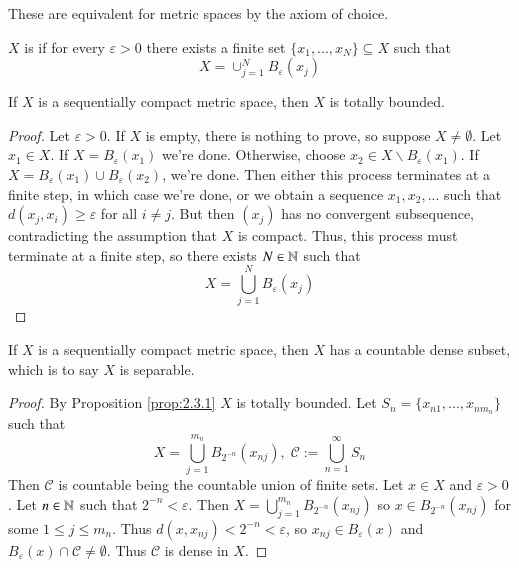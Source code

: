 These are equivalent for metric spaces by the axiom of choice.

\begin{defn}
    $X$ is  if for every $\varepsilon > 0$ there exists a finite set $\{x_1,...,x_N\} \subseteq X$ such that \begin{equation*}
        X = \cup_{j=1}^NB_{\varepsilon}(x_j)
    \end{equation*}
\end{defn}

\begin{prop}\label{prop:2.3.1}
    If $X$ is a sequentially compact metric space, then $X$ is totally bounded.
\end{prop}
\begin{proof}
    Let $\varepsilon > 0$. If $X$ is empty, there is nothing to prove, so suppose $X \neq \emptyset$. Let $x_1 \in X$. If $X = B_{\varepsilon}(x_1)$ we're done. Otherwise, choose $x_2 \in X\backslash B_{\varepsilon}(x_1)$. If $X = B_{\varepsilon}(x_1)\cup B_{\varepsilon}(x_2)$, we're done. Then either this process terminates at a finite step, in which case we're done, or we obtain a sequence $x_1,x_2,...$ such that $d(x_j,x_i) \geq \varepsilon$ for all $i \neq j$. But then $(x_j)$ has no convergent subsequence, contradicting the assumption that $X$ is compact. Thus, this process must terminate at a finite step, so there exists $N \in \mathbb N$ such that $$X  = \bigcup_{j=1}^NB_{\varepsilon}(x_j)$$
\end{proof}

\begin{cor}\label{cor:2.3.2}
    If $X$ is a sequentially compact metric space, then $X$ has a countable dense subset, which is to say $X$ is separable.
\end{cor}
\begin{proof}
    By Proposition \ref{prop:2.3.1} $X$ is totally bounded. Let $S_n = \{x_{n1},...,x_{nm_n}\}$ such that \begin{equation*}
        X = \bigcup_{j=1}^{m_n}B_{2^{-n}}(x_{nj}), \;\mathcal{C} := \bigcup_{n=1}^{\infty}S_n
    \end{equation*}
    Then $\mathcal{C}$ is countable being the countable union of finite sets. Let $x \in X$ and $\varepsilon > 0$. Let $n \in \mathbb N$ such that $2^{-n} < \varepsilon$. Then $X = \bigcup_{j=1}^{m_n}B_{2^{-n}}(x_{nj})$ so $x \in B_{2^{-n}}(x_{nj})$ for some $1 \leq j \leq m_n$. Thus $d(x,x_{nj}) < 2^{-n}<\varepsilon$, so $x_{nj} \in B_{\varepsilon}(x)$ and $B_{\varepsilon}(x)\cap \mathcal{C} \neq \emptyset$. Thus $\mathcal{C}$ is dense in $X$.
\end{proof}

